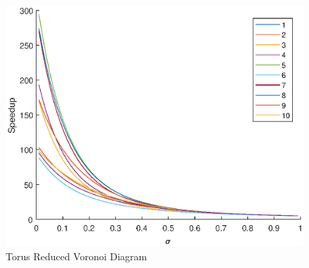 \begin{figure}[!ht]
\centering
\includegraphics[width=1\columnwidth]{figure/t_voronoi_speedup_save.eps}
\caption{Torus Reduced Voronoi Diagram}
\label{fig:t_voronoi}
\end{figure}

